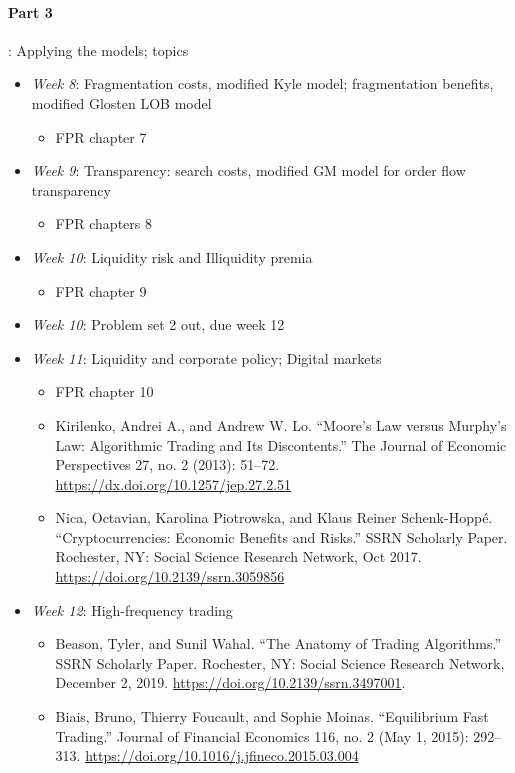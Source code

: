 \documentclass{article}
\begin{document}
\medskip
\paragraph{Part 3}: Applying the models; topics
\begin{itemize}
	\item \textit{Week 8}: Fragmentation costs, {modified Kyle model}; fragmentation benefits, {modified Glosten LOB model}
	\begin{itemize}
		\item FPR chapter 7
	\end{itemize}
	\item \textit{Week 9}: Transparency: search costs, {modified GM model} for order flow transparency
	\begin{itemize}
		\item FPR chapters 8
	\end{itemize}
	\item \textit{Week 10}: Liquidity risk and Illiquidity premia
	\begin{itemize}
		\item FPR chapter 9
	\end{itemize}
	\item \textit{Week 10}: Problem set 2 out, due week 12
	\item \textit{Week 11}: Liquidity and corporate policy; Digital markets
	\begin{itemize}
		\item FPR chapter 10
		\item Kirilenko, Andrei A., and Andrew W. Lo. “Moore’s Law versus Murphy’s Law: Algorithmic Trading and Its Discontents.” The Journal of Economic Perspectives 27, no. 2 (2013): 51–72. \url{https://dx.doi.org/10.1257/jep.27.2.51}
		\item Nica, Octavian, Karolina Piotrowska, and Klaus Reiner Schenk-Hoppé. “Cryptocurrencies: Economic Benefits and Risks.” SSRN Scholarly Paper. Rochester, NY: Social Science Research Network, Oct 2017. \url{https://doi.org/10.2139/ssrn.3059856}
	\end{itemize}
	\item \textit{Week 12}: High-frequency trading
	\begin{itemize}
		\item Beason, Tyler, and Sunil Wahal. “The Anatomy of Trading Algorithms.” SSRN Scholarly Paper. Rochester, NY: Social Science Research Network, December 2, 2019. \url{https://doi.org/10.2139/ssrn.3497001}.
		\item Biais, Bruno, Thierry Foucault, and Sophie Moinas. “Equilibrium Fast Trading.” Journal of Financial Economics 116, no. 2 (May 1, 2015): 292–313. \url{https://doi.org/10.1016/j.jfineco.2015.03.004}

\end{itemize}
\end{itemize}
\end{document}
